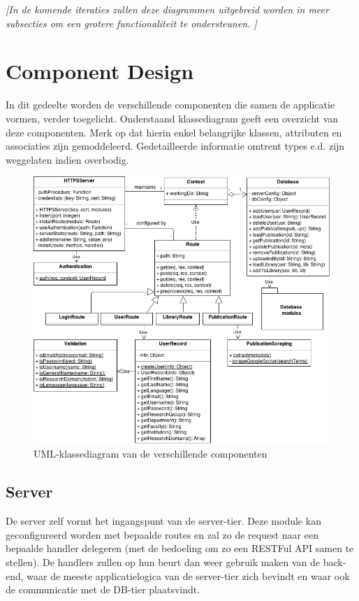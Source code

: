 \documentclass{article}
\begin{document}
\textit{[In de komende iteraties zullen deze diagrammen uitgebreid worden in meer subsecties om een grotere functionaliteit te ondersteunen. 
]}

\clearpage

\section{Component Design}
\label{sec:components}

In dit gedeelte worden de verschillende componenten die samen de applicatie vormen, verder toegelicht. Onderstaand klassediagram geeft een overzicht van deze componenten. Merk op dat hierin enkel belangrijke klassen, attributen en associaties zijn gemoddeleerd. Gedetailleerde informatie omtrent types e.d. zijn weggelaten indien overbodig. 

\begin{figure}[!h]
\centering
 \includegraphics[width=160mm]{Klassediagram.png}
 \caption{UML-klassediagram van de verschillende componenten }
 \label{class-diagram}
\end{figure}

\subsection{Server}

De server zelf vormt het ingangspunt van de server-tier. Deze module kan geconfigureerd worden met bepaalde routes en zal zo de request naar een bepaalde handler delegeren (met de bedoeling om zo een RESTFul API samen te stellen). De handlers zullen op hun beurt dan weer gebruik maken van de back-end, waar de meeste applicatielogica van de server-tier zich bevindt en waar ook de communicatie met de DB-tier plaatsvindt.  \\
\end{document}
